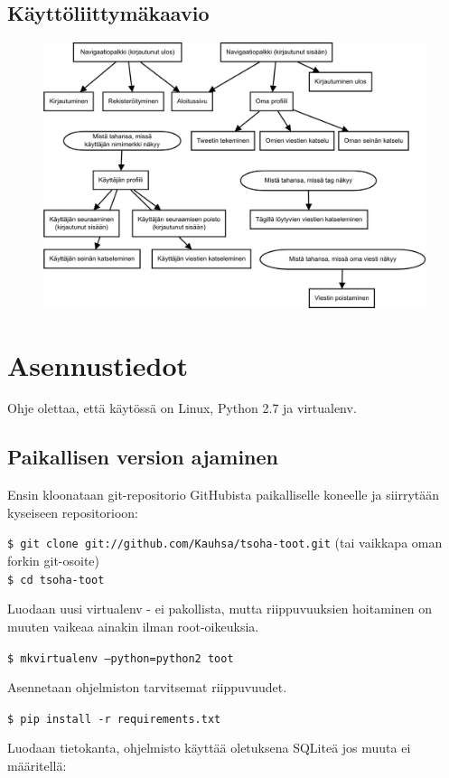 \documentclass{article}
\let\stdsection\section
\renewcommand\section{\newpage\stdsection}
\begin{document}
\subsection{Käyttöliittymäkaavio}
\begin{figure}[H]
    \centering
    \includegraphics[width=\textwidth]{navigaatio.pdf}
\end{figure}

\section{Asennustiedot}
Ohje olettaa, että käytössä on Linux, Python 2.7 ja virtualenv.

\subsection{Paikallisen version ajaminen}
Ensin kloonataan git-repositorio GitHubista paikalliselle koneelle ja siirrytään kyseiseen repositorioon:

\texttt{\$ git clone git://github.com/Kauhsa/tsoha-toot.git} (tai vaikkapa oman forkin git-osoite) \\
\texttt{\$ cd tsoha-toot}

Luodaan uusi virtualenv - ei pakollista, mutta riippuvuuksien hoitaminen on muuten vaikeaa ainakin ilman root-oikeuksia.

\texttt{\$ mkvirtualenv --python=python2 toot}

Asennetaan ohjelmiston tarvitsemat riippuvuudet.

\texttt{\$ pip install -r requirements.txt}

Luodaan tietokanta, ohjelmisto käyttää oletuksena SQLiteä jos muuta ei määritellä:
\end{document}
